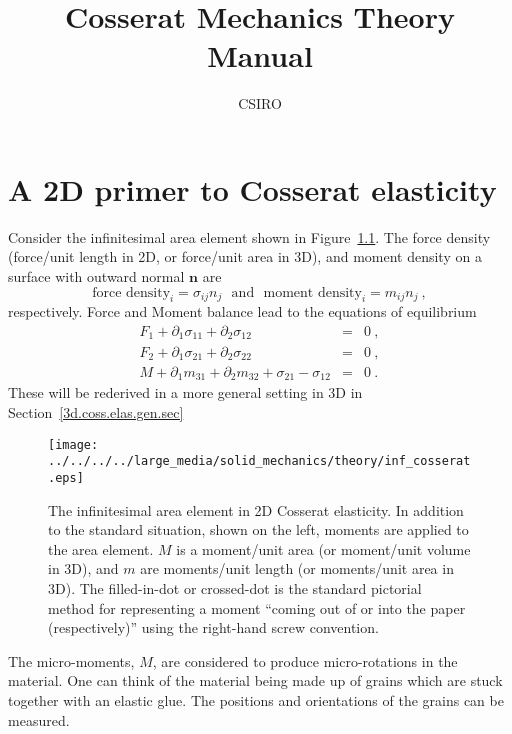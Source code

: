 \documentclass[]{scrreprt}
\newcommand{\si}{\sigma}
\newcommand{\mand}{\ \ \ \mbox{and}\ \ \ }
\newcommand{\pl}{\partial}
\begin{document}
\title{Cosserat Mechanics Theory Manual}
\author{CSIRO}
\maketitle

\tableofcontents

\chapter{A 2D primer to Cosserat elasticity}

Consider the infinitesimal area element shown in
Figure~\ref{inf_cosserat.fig}.  The force density (force/unit length
in 2D, or force/unit area in 3D), and moment density on a surface with
outward normal ${\mathbf n}$ are
$$
\mbox{force density}_{i} = \si_{ij}n_{j} \mand
\mbox{moment density}_{i} = m_{ij}n_{j} \ ,
$$
respectively.  Force and Moment balance lead to the
equations of equilibrium
\begin{eqnarray*}
F_{1} + \pl_{1}\si_{11} + \pl_{2}\si_{12} & = & 0 \ ,\\
F_{2} + \pl_{1}\si_{21} + \pl_{2}\si_{22} & = & 0 \ ,\\
M + \pl_{1}m_{31} + \pl_{2}m_{32} + \si_{21}-\si_{12} & = & 0 \ .
\end{eqnarray*}
These will be rederived in a more general setting in 3D in Section~\ref{3d.coss.elas.gen.sec}

\begin{figure}[htb]
\begin{center}
\texttt{[image: ../../../../large\_media/solid\_mechanics/theory/inf\_cosserat.eps]}
\caption{The infinitesimal area element in 2D Cosserat elasticity.
  In addition to the standard situation, shown on the left, moments
  are applied to the area element.  $M$ is a moment/unit area (or
  moment/unit volume in 3D), and $m$ are moments/unit length (or
  moments/unit area in 3D).  The filled-in-dot or crossed-dot
  is the standard pictorial method for representing a moment ``coming
  out of or into the paper (respectively)'' using the right-hand screw
  convention.}
\label{inf_cosserat.fig}
\end{center}
\end{figure}

The micro-moments, $M$, are considered to produce micro-rotations in
the material.  One can think of the material being made up of grains
which are stuck together with an elastic glue.  The positions and
orientations of the grains can be measured.
\end{document}
